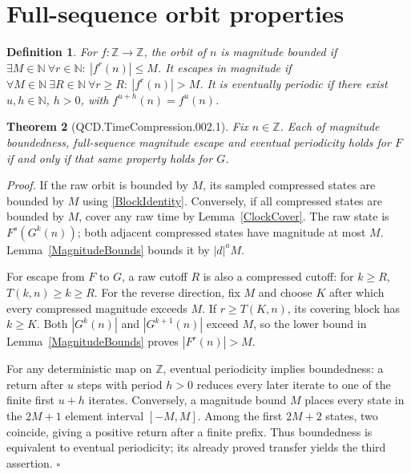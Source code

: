 \documentclass[11pt,letterpaper]{article}
\newcommand{\N}{\mathbb{N}}
\newcommand{\Z}{\mathbb{Z}}
\newtheorem{theorem}{Theorem}
\newtheorem{definition}[theorem]{Definition}
\newenvironment{proof}{\noindent\textit{Proof.}}{\hfill\(\square\)}
\begin{document}
\section{Full-sequence orbit properties}

\begin{definition}
For \(f:\Z\to\Z\), the orbit of \(n\) is magnitude bounded if
\(\exists M\in\N\ \forall r\in\N:\ |f^r(n)|\le M\). It escapes in magnitude
if \(\forall M\in\N\ \exists R\in\N\ \forall r\ge R:\ |f^r(n)|>M\).
It is eventually periodic if there exist \(u,h\in\N\), \(h>0\), with
\(f^{u+h}(n)=f^u(n)\).
\end{definition}

\begin{theorem}[QCD.TimeCompression.002.1]\label{Outcomes}
Fix \(n\in\Z\). Each of magnitude boundedness, full-sequence magnitude
escape and eventual periodicity holds for \(F\) if and only if that same
property holds for \(G\).
\end{theorem}
\begin{proof}
If the raw orbit is bounded by \(M\), its sampled compressed states are
bounded by \(M\) using \eqref{BlockIdentity}. Conversely, if all compressed
states are bounded by \(M\), cover any raw time by Lemma~\ref{ClockCover}.
The raw state is \(F^s(G^k(n))\); both adjacent compressed states have magnitude
at most \(M\). Lemma~\ref{MagnitudeBounds} bounds it by \(|d|^aM\).

For escape from \(F\) to \(G\), a raw cutoff \(R\) is also a compressed
cutoff: for \(k\ge R\), \(T(k,n)\ge k\ge R\). For the reverse direction,
fix \(M\) and choose \(K\) after which every compressed magnitude exceeds
\(M\). If \(r\ge T(K,n)\), its covering block has \(k\ge K\).
Both \(|G^k(n)|\) and \(|G^{k+1}(n)|\) exceed \(M\), so the lower bound in
Lemma~\ref{MagnitudeBounds} proves \(|F^r(n)|>M\).

For any deterministic map on \(\Z\), eventual periodicity implies boundedness:
a return after \(u\) steps with period \(h>0\) reduces every later iterate to
one of the finite first \(u+h\) iterates. Conversely, a magnitude bound \(M\)
places every state in the \(2M+1\) element interval \([-M,M]\).
Among the first \(2M+2\) states, two coincide, giving a positive return after
a finite prefix. Thus boundedness is equivalent to eventual periodicity;
its already proved transfer yields the third assertion.
\end{proof}
\end{document}
